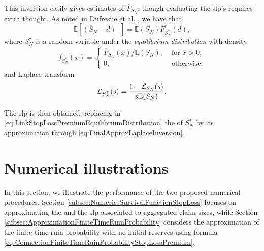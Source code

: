 This inversion easily gives estimates of $\overline{F}_{S_N}$, though evaluating the slp's requires extra thought.
As noted in Dufresne et al. \cite{DuGaMo09}, we have that
\begin{equation}\label{eq:LinkStopLossPremiumEquilibriumDistribution}
\mathbb{E}\left[(S_N-d)_{+}\right]=\mathbb{E}(S_N)\overline{F_{S_N^{\ast}}}(d),
\end{equation}
where $S_N^{\ast}$ is a random variable under the \emph{equilibrium distribution} with density
\begin{equation*}
f_{S_N^{\ast}}(x)=\begin{cases}
\overline{F}_{S_N}(x) / \mathbb{E}(S_N),&\text{ for }x>0,\\
0,&\text{ otherwise},
\end{cases}
\end{equation*}
and Laplace transform
\begin{equation*}\label{eq:LaplaceTransformEquilibriumDistribution}
\mathcal{L}_{S_N^{\top}}(s)=\frac{1-\mathcal{L}_{S_N}(s)}{s\mathbb{E}(S_N)}.
\end{equation*}

The slp is then obtained, replacing in \eqref{eq:LinkStopLossPremiumEquilibriumDistribution} the \svf of $S_N^{\ast}$ by its approximation through \eqref{eq:FinalApproxLaplaceInversion}.
%

\section{Numerical illustrations}\label{sec:NumericalIllustrations}
In this section, we illustrate the performance of the two proposed numerical procedures. Section \ref{subsec:NumericsSurvivalFunctionStopLoss} focuses on approximating the \svf and the slp associated to aggregated claim sizes, while Section \ref{subsec:ApproximationFiniteTimeRuinProbability} considers the approximation of the finite-time ruin probability with no initial reserves using formula \eqref{eq:ConnectionFiniteTimeRuinProbabilityStopLossPremium}.

